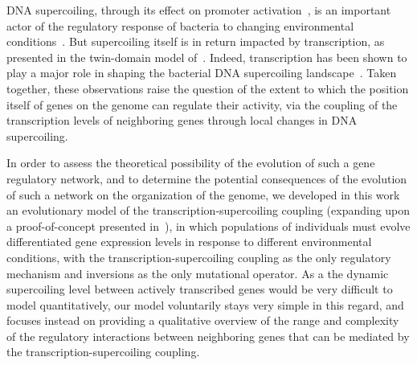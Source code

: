 DNA supercoiling, through its effect on promoter activation~\citep{forquet2021}, is an important actor of the regulatory response of bacteria to changing environmental conditions~\citep{martisb.2019}.
But supercoiling itself is in return impacted by transcription, as presented in the twin-domain model of~\cite{liu1987}.
Indeed, transcription has been shown to play a major role in shaping the bacterial DNA supercoiling landscape~\citep{visser2022}.
Taken together, these observations raise the question of the extent to which the position itself of genes on the genome can regulate their activity, via the coupling of the transcription levels of neighboring genes through local changes in DNA supercoiling.

In order to assess the theoretical possibility of the evolution of such a gene regulatory network, and to determine the potential consequences of the evolution of such a network on the organization of the genome, we developed in this work an evolutionary model of the transcription-supercoiling coupling (expanding upon a proof-of-concept presented in~\cite{grohens2021}), in which populations of individuals must evolve differentiated gene expression levels in response to different environmental conditions, with the transcription-supercoiling coupling as the only regulatory mechanism and inversions as the only mutational operator.
As a the dynamic supercoiling level between actively transcribed genes would be very difficult to model quantitatively, our model voluntarily stays very simple in this regard, and focuses instead on providing a qualitative overview of the range and complexity of the regulatory interactions between neighboring genes that can be mediated by the transcription-supercoiling coupling.

